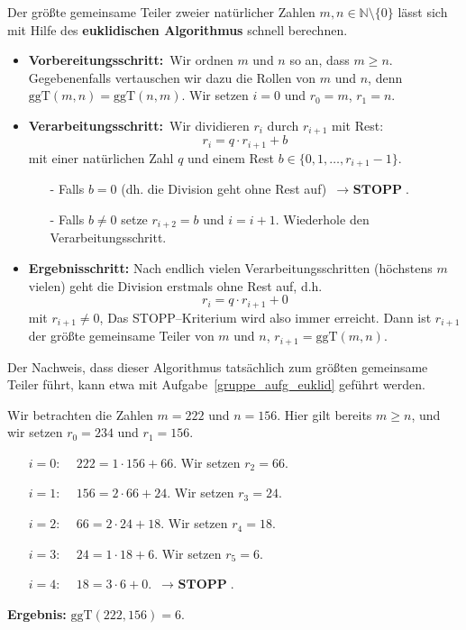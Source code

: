 \medbreak

Der größte gemeinsame Teiler zweier natürlicher Zahlen $m,n\in \mathbb N \setminus \{0 \}$ 
lässt sich mit Hilfe des \textbf{euklidischen Algorithmus} 
schnell berechnen. 


\vspace{-0.4cm}
\begin{itemize} 
\item \textbf{Vorbereitungsschritt:\,} Wir ordnen $m$ und $n$ so an, dass $m \geq n$. Gegebenenfalls vertauschen 
wir dazu die Rollen von $m$ und $n$, denn $\textrm{ggT}(m,n) = \textrm{ggT}(n,m)$. Wir setzen $i = 0$ und 
$r_0 = m$, $r_1 = n$.
\item \textbf{Verarbeitungsschritt:\,} Wir dividieren $r_i$ durch $r_{i+1}$ mit Rest:
  	$$ r_i = q \cdot r_{i+1} + b $$
mit einer natürlichen Zahl $q$ und einem Rest $b \in \{0, 1, \ldots, r_{i+1} - 1 \}$.
\begin{itemize}
\item[-] Falls $b = 0$ (dh. die Division geht ohne Rest auf) $\, \longrightarrow \textbf{ STOPP}$.
\item[-] Falls $b \neq 0$ setze $r_{i+2} = b$ und $i = i+1$. Wiederhole den Verarbeitungsschritt.
\end{itemize}
\item \textbf{Ergebnisschritt:} Nach endlich vielen Verarbeitungsschritten (höchstens $m$ vielen) geht die 
Division erstmals ohne Rest auf, d.h.
  	$$ r_i = q \cdot r_{i+1} + 0 $$
mit $r_{i+1} \neq 0$, Das STOPP--Kriterium wird also immer erreicht. 
Dann ist $r_{i+1}$ der größte gemeinsame Teiler von $m$ und $n$, $r_{i+1} = \textrm{ggT}(m,n)$.
\end{itemize}

Der Nachweis, dass dieser Algorithmus tatsächlich zum größten gemeinsame Teiler führt, kann etwa mit 
Aufgabe~\ref{gruppe_aufg_euklid} geführt werden.

\bigbreak

\begin{beispiel}\label{LA_alg_bsp_euklid1} Wir betrachten die Zahlen $m = 222$ und $n = 156$. Hier gilt bereits 
$m \geq n$, und wir setzen $r_0 = 234$ und $r_1 = 156$.

\begin{itemize}
\item[ ]$i = 0$: $\quad 222 = 1 \cdot 156 + 66$. Wir setzen $r_2 = 66$.
\item[ ]$i = 1$: $\quad 156 = 2 \cdot 66 + 24$. Wir setzen $r_3 = 24$.
\item[ ]$i = 2$: $\quad 66 = 2 \cdot 24 + 18$. Wir setzen $r_4 = 18$.
\item[ ]$i = 3$: $\quad 24 = 1 \cdot 18 + 6$. Wir setzen $r_5 = 6$.
\item[ ]$i = 4$: $\quad 18 = 3 \cdot 6 + 0$. $\, \longrightarrow \textbf{ STOPP}$.
\end{itemize}

\textbf{Ergebnis:} $\textrm{ggT}(222, 156) = 6$.
\end{beispiel}

